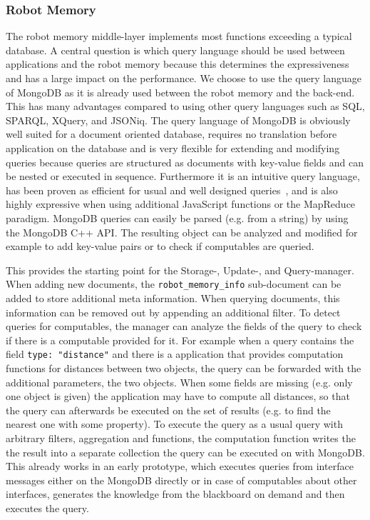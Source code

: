 \documentclass[a4paper,11pt]{article}
\begin{document}
\subsubsection{Robot Memory}
\label{sec:impl-memory}
The robot memory middle-layer implements most functions exceeding a
typical database.
A central question is
which query language should be used between applications and the robot
memory because this determines the expressiveness and has a large impact
on the performance. We choose to use the query language of MongoDB as
it is already  used between the robot memory and the back-end. This has many
advantages compared to using other query languages such as SQL,
SPARQL, XQuery, and JSONiq. The query language of MongoDB is obviously
well suited for a document oriented database, requires no translation
before application on the database and is very flexible for extending
and modifying queries because queries are structured as documents with
key-value fields and can be nested or executed in
sequence. Furthermore it is an intuitive query language, has been
proven as efficient for usual and well designed
queries~\cite{mongodb,RoboDB}, and is also highly expressive when
using additional JavaScript functions or the MapReduce
paradigm. MongoDB queries can easily be parsed (e.g. from a string) by
using the MongoDB C++ API. The resulting object can be analyzed and
modified for example to add key-value pairs or to check if computables are queried.

This provides the starting point for the Storage-, Update-, and
Query-manager. When adding new documents, the
\texttt{robot\_memory\_info} sub-document can be added to store
additional meta information. When querying documents, this information
can be removed out by appending an additional filter. To detect
queries for computables, the manager can analyze the fields of
the query to check if there is a computable provided for it.
For example when a query contains the field \texttt{type:
  "distance"} and there is a application that provides computation
functions for distances between two objects, the query can be forwarded
with the additional parameters, the two objects.
When some fields are missing
(e.g. only one object is given) the application may have to compute
all distances, so that the query can afterwards be executed on the set
of results (e.g. to find the nearest one with some property). To
execute the query as a usual query with arbitrary filters, aggregation
and functions, the computation function writes the the result into a
separate collection the query can be executed on with MongoDB. This
already works in an early prototype, which executes queries from
interface messages either on the MongoDB directly or in case of
computables about other interfaces, generates the knowledge from
the blackboard on demand and then executes the query.
\end{document}
